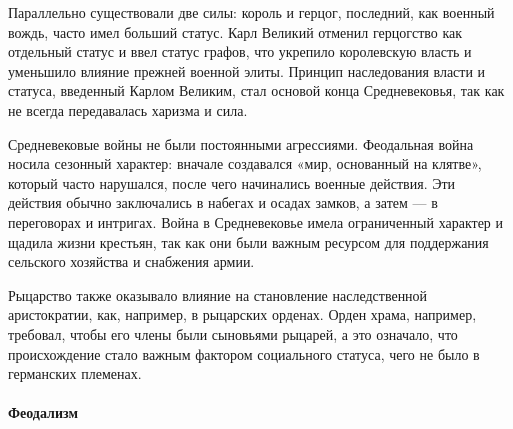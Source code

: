 Параллельно существовали две силы: король и герцог, последний, как военный вождь, часто имел больший статус. Карл Великий отменил герцогство как отдельный статус и ввел статус графов, что укрепило королевскую власть и уменьшило влияние прежней военной элиты. Принцип наследования власти и статуса, введенный Карлом Великим, стал основой конца Средневековья, так как не всегда передавалась харизма и сила.

Средневековые войны не были постоянными агрессиями. Феодальная война носила сезонный характер: вначале создавался «мир, основанный на клятве», который часто нарушался, после чего начинались военные действия. Эти действия обычно заключались в набегах и осадах замков, а затем --- в переговорах и интригах. Война в Средневековье имела ограниченный характер и щадила жизни крестьян, так как они были важным ресурсом для поддержания сельского хозяйства и снабжения армии.

Рыцарство также оказывало влияние на становление наследственной аристократии, как, например, в рыцарских орденах. Орден храма, например, требовал, чтобы его члены были сыновьями рыцарей, а это означало, что происхождение стало важным фактором социального статуса, чего не было в германских племенах.

\paragraph{Феодализм}

